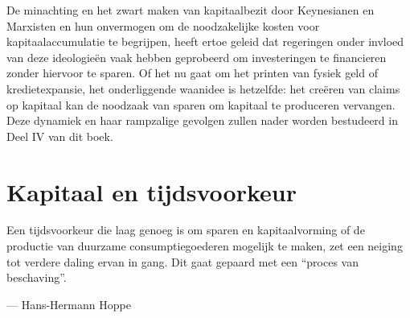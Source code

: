 De minachting en het zwart maken van kapitaalbezit door Keynesianen en Marxisten en hun onvermogen om de noodzakelijke kosten voor kapitaalaccumulatie te begrijpen, heeft ertoe geleid dat regeringen onder invloed van deze ideologieën vaak hebben geprobeerd om investeringen te financieren zonder hiervoor te sparen. Of het nu gaat om het printen van fysiek geld of kredietexpansie, het onderliggende waanidee is hetzelfde: het creëren van claims op kapitaal kan de noodzaak van sparen om kapitaal te produceren vervangen. Deze dynamiek en haar rampzalige gevolgen zullen nader worden bestudeerd in Deel IV van dit boek.

\hypertarget{kapitaal-en-tijdsvoorkeur}{%
\section{Kapitaal en tijdsvoorkeur}\label{kapitaal-en-tijdsvoorkeur}}

\begin{blockquotebox}
    Een tijdsvoorkeur die laag genoeg is om sparen en kapitaalvorming of de productie van duurzame consumptiegoederen mogelijk te maken, zet een neiging tot verdere daling ervan in gang. Dit gaat gepaard met een ``proces van beschaving''.\footnotemark
    \par\raggedleft--- Hans-Hermann Hoppe
\end{blockquotebox}

